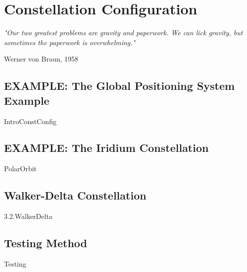 \chapter{Constellation Configuration}

\epigraph{\textit{"Our two greatest problems are gravity and paperwork. We can lick gravity, but sometimes the paperwork is overwhelming."}}{Werner von Braun, 1958} 
\newpage
\section{EXAMPLE: The Global Positioning System Example}
{IntroConstConfig}
\newpage
\section{EXAMPLE: The Iridium Constellation}
{PolarOrbit}

\section{Walker-Delta Constellation}
{3.2.WalkerDelta}

\section{Testing Method}
\label{Testing}
{Testing}
